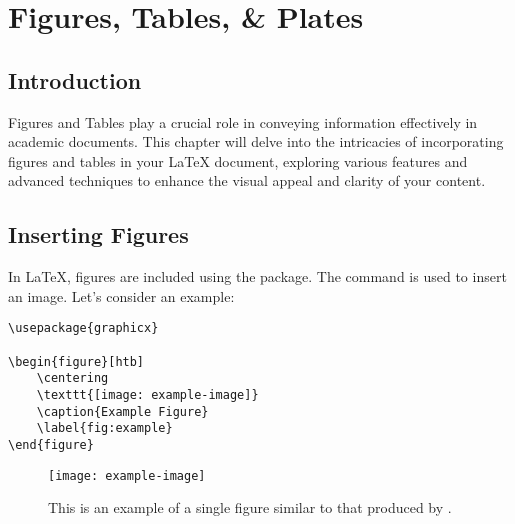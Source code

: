 \chapter{Figures, Tables, \& Plates}\label{ch:figureandtables}
	\section{Introduction}
		Figures and Tables play a crucial role in conveying information effectively in academic documents. 
		This chapter will delve into the intricacies of incorporating figures and tables in your LaTeX document, exploring various features and advanced techniques to enhance the visual appeal and clarity of your content.



	\section{Inserting Figures}
		In \LaTeX, figures are included using the  package. 
		The  command is used to insert an image. 
		Let's consider an example:

		\begin{lstlisting}[float=ht,caption=A Basic Example of Including a Figure.,label=lst:figureExample,style=LaTeXStyle,basicstyle=\small\ttfamily,]
\usepackage{graphicx}

\begin{figure}[htb]
	\centering
	\texttt{[image: example-image]}
	\caption{Example Figure}
	\label{fig:example}
\end{figure}
		\end{lstlisting}

		\begin{figure}[H]
			\centering
			\texttt{[image: example-image]}
			\caption{This is an example of a single figure similar to that produced by .}
			\label{fig:singleImage}
		\end{figure}

